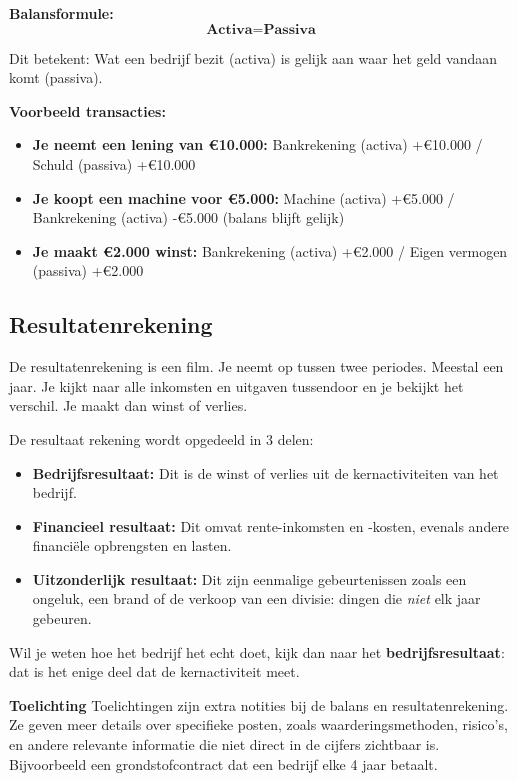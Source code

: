 \documentclass[a4paper,11pt]{article}
\begin{document}
\textbf{Balansformule:}
$$\textbf{Activa} = \textbf{Passiva}$$

Dit betekent: Wat een bedrijf bezit (activa) is gelijk aan waar het geld vandaan komt (passiva).


\textbf{Voorbeeld transacties:}
\begin{itemize}
    \item \textbf{Je neemt een lening van €10.000:} Bankrekening (activa) +€10.000 / Schuld (passiva) +€10.000
    \item \textbf{Je koopt een machine voor €5.000:} Machine (activa) +€5.000 / Bankrekening (activa) -€5.000 (balans blijft gelijk)
    \item \textbf{Je maakt €2.000 winst:} Bankrekening (activa) +€2.000 / Eigen vermogen (passiva) +€2.000
\end{itemize}

\subsection{Resultatenrekening}
De resultatenrekening is een film. Je neemt op tussen twee periodes. Meestal een jaar.
Je kijkt naar alle inkomsten en uitgaven tussendoor
en je bekijkt het verschil. Je  maakt dan winst of
verlies.

De resultaat rekening wordt opgedeeld in 3 delen:
\begin{itemize}
    \item \textbf{Bedrijfsresultaat:} Dit is de winst of verlies uit de kernactiviteiten van het bedrijf.
    \item \textbf{Financieel resultaat:} Dit omvat rente-inkomsten en -kosten, evenals andere financiële opbrengsten en lasten.
    \item \textbf{Uitzonderlijk resultaat:} Dit zijn eenmalige gebeurtenissen zoals
          een ongeluk, een brand of de verkoop van een divisie: dingen die \emph{niet} elk jaar gebeuren.
\end{itemize}

Wil je weten hoe het bedrijf het echt doet, kijk dan naar het \textbf{bedrijfsresultaat}:
dat is het enige deel dat de kernactiviteit meet.

\textbf{Toelichting}
Toelichtingen zijn extra notities bij de balans en resultatenrekening.
Ze geven meer details over specifieke posten, zoals waarderingsmethoden,
risico's, en andere relevante informatie die niet direct in de cijfers zichtbaar is.
Bijvoorbeeld een grondstofcontract dat een bedrijf elke 4 jaar betaalt.
\newline
\end{document}
